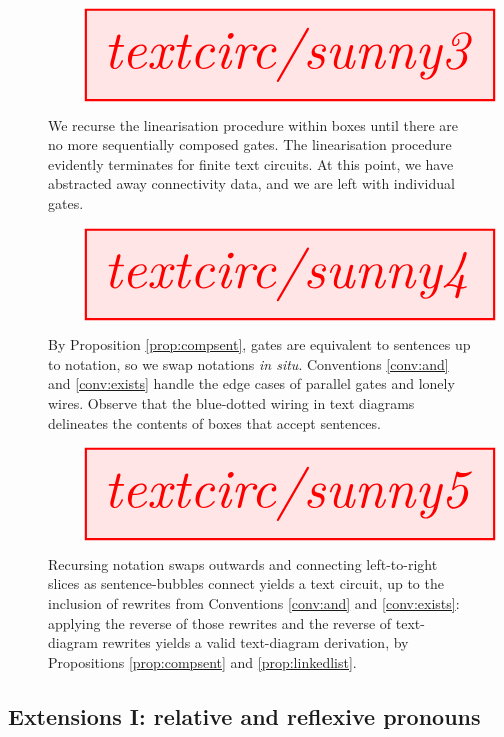 \begin{construction}
\begin{figure}[h!]
\centering
\[
\resizebox{\textwidth}{!}{\tikzfig{textcirc/sunny3}}
\]
\caption{We recurse the linearisation procedure within boxes until there are no more sequentially composed gates. The linearisation procedure evidently terminates for finite text circuits. At this point, we have abstracted away connectivity data, and we are left with individual gates.}
\end{figure}

\begin{figure}[h!]
\centering
\[
\resizebox{\textwidth}{!}{\tikzfig{textcirc/sunny4}}
\]
\caption{By Proposition \ref{prop:compsent}, gates are equivalent to sentences up to notation, so we swap notations \emph{in situ}. Conventions \ref{conv:and} and \ref{conv:exists} handle the edge cases of parallel gates and lonely wires. Observe that the blue-dotted wiring in text diagrams delineates the contents of boxes that accept sentences.}
\end{figure}

\begin{figure}[h!]
\centering
\[
\resizebox{\textwidth}{!}{\tikzfig{textcirc/sunny5}}
\]
\caption{Recursing notation swaps outwards and connecting left-to-right slices as sentence-bubbles connect yields a text circuit, up to the inclusion of rewrites from Conventions \ref{conv:and} and \ref{conv:exists}: applying the reverse of those rewrites and the reverse of text-diagram rewrites yields a valid text-diagram derivation, by Propositions \ref{prop:compsent} and \ref{prop:linkedlist}.}
\end{figure}
\end{construction}

\newpage
\subsection{Extensions I: relative and reflexive pronouns}


\begin{example}

\end{example}


\begin{example}

\end{example}


